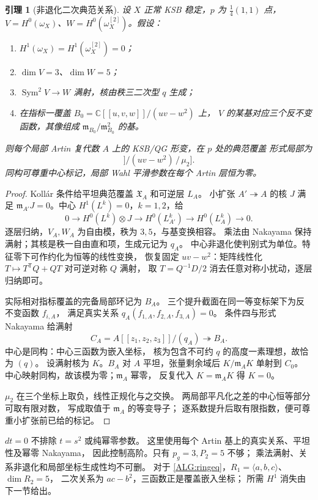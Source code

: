 \documentclass[UTF8,fontset=fandol,zihao=-4,oneside,openany]{ctexbook}
\theoremstyle{cjkplain}
\newtheorem{lemma}[theorem]{引理}
\numberwithin{equation}{chapter}
\begin{document}
\begin{lemma}[非退化二次典范关系]
\label{ALG:quadratic}
设 $X$ 正常 KSB 稳定，$p$ 为 $\frac14(1,1)$ 点，
$V=H^0(\omega_X)$、$W=H^0(\omega_X^{[2]})$。假设：
\begin{enumerate}
\item $H^1(\omega_X)=H^1(\omega_X^{[2]})=0$；
\item $\dim V=3$、$\dim W=5$；
\item $\operatorname{Sym}^2V\to W$ 满射，核由秩三二次型 $q$ 生成；
\item 在指标一覆盖 $B_0=\mathbb C[[u,v,w]]/(uv-w^2)$ 上，
$V$ 的某基对应三个反不变函数，其像组成
$\mathfrak m_{B_0}/\mathfrak m_{B_0}^2$ 的基。
\end{enumerate}
则每个局部 Artin 复代数 $A$ 上的 KSB/QG 形变，在 $p$ 处的典范覆盖
形式局部为
\begin{equation}
[\operatorname{Spf}A[[u,v,w]]/(uv-w^2)\,/\,\mu_2].
\label{ALG:allartinlocal}
\end{equation}
同构可尊重中心标记，局部 Wahl 平滑参数在每个 Artin 层恒为零。
\end{lemma}
\begin{proof}
Kollár 条件给平坦典范覆盖 $\mathfrak X_A$ 和可逆层 $L_A$。
小扩张 $A'\twoheadrightarrow A$ 的核 $J$ 满足
$\mathfrak m_{A'}J=0$。中心 $H^1(L^k)=0$，$k=1,2$，给
\[
0\to H^0(L^k)\otimes J\to H^0(L_{A'}^k)\to H^0(L_A^k)\to0.
\]
逐层归纳，$V_A,W_A$ 为自由模，秩为 $3,5$，与基变换相容。
乘法由 Nakayama 保持满射；其核是秩一自由直和项，生成元记为 $q_A$。
中心非退化使判别式为单位。特征零下可作约化为恒等的线性变换，
恢复固定 $uv-w^2$：矩阵线性化
$T\mapsto T^{\mathsf T}Q+QT$ 对可逆对称 $Q$ 满射，
取 $T=Q^{-1}D/2$ 消去任意对称小扰动，逐层归纳即可。

实际相对指标覆盖的完备局部环记为 $B_A$。
三个提升截面在同一等变标架下为反不变函数 $f_{i,A}$，
满足真实关系 $q_A(f_{1,A},f_{2,A},f_{3,A})=0$。
条件四与形式 Nakayama 给满射
\[
C_A=A[[z_1,z_2,z_3]]/(q_A)\twoheadrightarrow B_A.
\]
中心是同构：中心三函数为嵌入坐标，
核为包含不可约 $q$ 的高度一素理想，故恰为 $(q)$。
设满射核为 $K$。$B_A$ 对 $A$ 平坦，张量剩余域后
$K/\mathfrak m_AK$ 单射到 $C_0$。
中心映射同构，故该模为零；$\mathfrak m_A$ 幂零，
反复代入 $K=\mathfrak m_AK$ 得 $K=0$。

$\mu_2$ 在三个坐标上取负，线性正规化与之交换。
两局部平凡化之差的中心恒等部分可取有限对数，
写成取值于 $\mathfrak m_A$ 的等变导子；
逐系数提升后取有限指数，便可尊重小扩张前已给的标记。
\end{proof}

$dt=0$ 不排除 $t=s^2$ 或纯幂零参数。
这里使用每个 Artin 基上的真实关系、平坦性及幂零 Nakayama，
因此控制高阶。只有 $p_g=3,P_2=5$ 不够；
乘法满射、关系非退化和局部坐标生成性均不可删。
对于 \eqref{ALG:ringeq}，$R_1=\langle a,b,c\rangle$、$\dim R_2=5$，
二次关系为 $ac-b^2$，三函数正是覆盖嵌入坐标；
所需 $H^1$ 消失由下一节给出。
\end{document}
